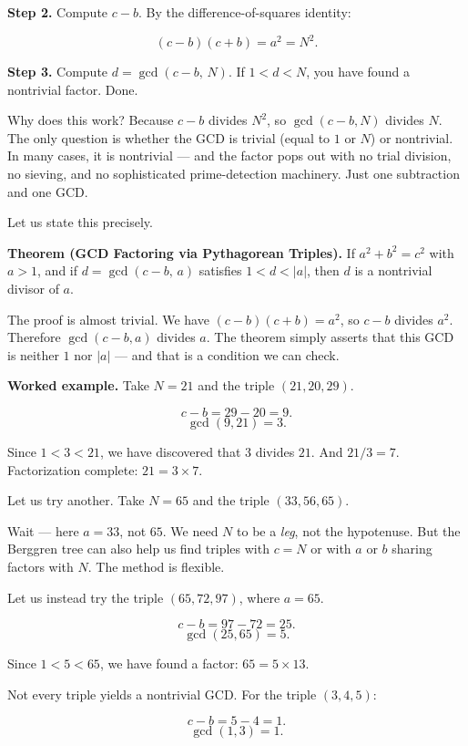 \textbf{Step 2.} Compute \(c - b\). By the difference-of-squares identity:

\[(c - b)(c + b) = a^2 = N^2.\]

\textbf{Step 3.} Compute \(d = \gcd(c - b, \, N)\). If \(1 < d < N\), you have found a nontrivial factor. Done.

Why does this work? Because \(c - b\) divides \(N^2\), so \(\gcd(c - b, N)\) divides \(N\). The only question is whether the GCD is trivial (equal to \(1\) or \(N\)) or nontrivial. In many cases, it is nontrivial --- and the factor pops out with no trial division, no sieving, and no sophisticated prime-detection machinery. Just one subtraction and one GCD.

Let us state this precisely.

\textbf{Theorem (GCD Factoring via Pythagorean Triples).} If \(a^2 + b^2 = c^2\) with \(a > 1\), and if \(d = \gcd(c - b, \, a)\) satisfies \(1 < d < |a|\), then \(d\) is a nontrivial divisor of \(a\).

The proof is almost trivial. We have \((c - b)(c + b) = a^2\), so \(c - b\) divides \(a^2\). Therefore \(\gcd(c - b, a)\) divides \(a\). The theorem simply asserts that this GCD is neither \(1\) nor \(|a|\) --- and that is a condition we can check.

\textbf{Worked example.} Take \(N = 21\) and the triple \((21, 20, 29)\).

\[c - b = 29 - 20 = 9.\] \[\gcd(9, 21) = 3.\]

Since \(1 < 3 < 21\), we have discovered that \(3\) divides \(21\). And \(21 / 3 = 7\). Factorization complete: \(21 = 3 \times 7\).

Let us try another. Take \(N = 65\) and the triple \((33, 56, 65)\).

Wait --- here \(a = 33\), not \(65\). We need \(N\) to be a \emph{leg}, not the hypotenuse. But the Berggren tree can also help us find triples with \(c = N\) or with \(a\) or \(b\) sharing factors with \(N\). The method is flexible.

Let us instead try the triple \((65, 72, 97)\), where \(a = 65\).

\[c - b = 97 - 72 = 25.\] \[\gcd(25, 65) = 5.\]

Since \(1 < 5 < 65\), we have found a factor: \(65 = 5 \times 13\).

Not every triple yields a nontrivial GCD. For the triple \((3, 4, 5)\):

\[c - b = 5 - 4 = 1.\] \[\gcd(1, 3) = 1.\]

